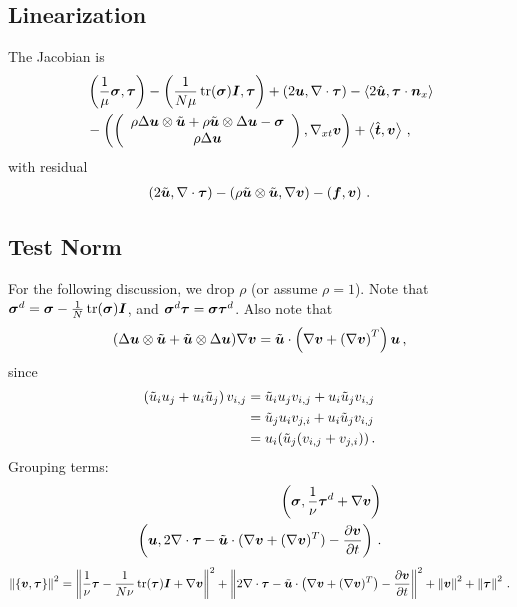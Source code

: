 \documentclass{article}
\begin{document}
\subsection*{Linearization}
The Jacobian is
\begin{align*}
&\LRp{\frac{1}{\mu}\bfsigma,\bftau}-\LRp{\frac{1}{N\mu}\trace(\bfsigma)\bfI,\bftau}+\LRp{2\bfu,\Div\bftau}-\LRa{2\hat\bfu,\bftau\cdot\bfn_x}\\
&-\LRp{\vecttwo{\rho\Delta\bfu\otimes\tilde\bfu+\rho\tilde\bfu\otimes\Delta\bfu-\bfsigma}{\rho\Delta\bfu},\Gradxt\bfv}+\LRa{\hat\bft,\bfv}\,,
\end{align*}
with residual
\begin{align*}
\LRp{2\tilde\bfu,\Div\bftau}
-\LRp{\rho\tilde\bfu\otimes\tilde\bfu,\Grad\bfv}-\LRp{\bff,\bfv}\,.
\end{align*}

\subsection*{Test Norm}
For the following discussion, we drop $\rho$ (or assume $\rho=1$).
Note that $\bfsigma^d=\bfsigma-\frac{1}{N}\trace(\bfsigma)\bfI$, and $\bfsigma^d\bftau=\bfsigma\bftau^d$.
Also note that 
\[
(\Delta\bfu\otimes\tilde\bfu+\tilde\bfu\otimes\Delta\bfu)\Grad\bfv=\tilde\bfu\cdot\LRp{\Grad\bfv+\LRp{\Grad\bfv}^T}\bfu\,,
\]
since
\begin{align*}
  \LRp{\tilde u_i u_j+u_i\tilde u_j}v_{i,j}&=\tilde u_i u_j v_{i,j}+u_i \tilde u_j v_{i,j}\\
  &=\tilde u_j u_i v_{j,i}+u_i \tilde u_j v_{i,j}\\
  &=u_i(\tilde u_j(v_{i,j}+v_{j,i}))\,.
\end{align*}
Grouping terms:
\begin{align*}
\LRp{\bfsigma,\frac{1}{\nu}\bftau^d+\Grad\bfv}\\
\LRp{\bfu,2\Div\bftau-\tilde\bfu\cdot(\Grad\bfv+(\Grad\bfv)^T)-\frac{\partial\bfv}{\partial t}}\,.
\end{align*}
\begin{equation*}
\norm{\LRc{\bfv,\bftau}}^2=\norm{\frac{1}{\nu}\bftau-\frac{1}{N\nu}\trace(\bftau)\bfI+\Grad\bfv}^2
+\norm{2\Div\bftau-\tilde\bfu\cdot\LRp{\Grad\bfv+(\Grad\bfv)^T}-\frac{\partial\bfv}{\partial t}}^2
+\norm{\bfv}^2
+\norm{\bftau}^2\,.
\end{equation*}
\end{document}
